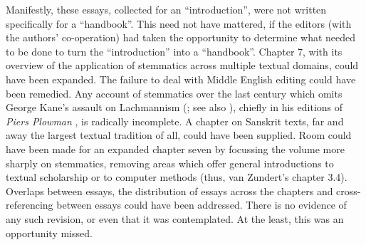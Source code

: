 \documentclass{article}
\begin{document}
Manifestly, these essays, collected for an ``introduction'',
were not written specifically for a ``handbook''. This need not have
mattered, if the editors (with the authors' co-operation) had taken the
opportunity to determine what needed to be done to turn the
``introduction'' into a ``handbook''. Chapter 7, with its overview of
the application of stemmatics across multiple textual domains, could
have been expanded. The failure to deal with Middle English editing
could have been remedied. Any account of stemmatics over the last
century which omits George Kane's assault on Lachmannism (\cite{kane_john_1984}; see also \cite[102--18]{donaldson_psychology_1970}), chiefly in his editions of \emph{Piers Plowman} \parencite{langland_piers_1960,langland_piers_1975}, is radically incomplete. A chapter on Sanskrit
texts, far and away the largest textual tradition of all, could have
been supplied. Room could have been made for an expanded chapter seven
by focussing the volume more sharply on stemmatics, removing areas which
offer general introductions to textual scholarship or to computer
methods (thus, van Zundert's chapter 3.4). Overlaps between essays, the
distribution of essays across the chapters and cross-referencing between
essays could have been addressed. There is no evidence of any such
revision, or even that it was contemplated. At the least, this was an
opportunity missed.
\end{document}
